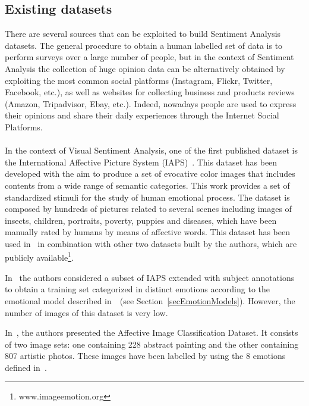 \subsection{Existing datasets}
There are several sources that can be exploited to build Sentiment Analysis datasets. The general procedure to obtain a human labelled set of data is to perform surveys over a large number of people, but in the context of Sentiment Analysis the collection of huge opinion data can be alternatively obtained by exploiting the most common social platforms (Instagram, Flickr, Twitter, Facebook, etc.), as well as websites for collecting business and products reviews (Amazon, Tripadvisor, Ebay, etc.). Indeed, nowadays people are used to express their opinions and share their daily experiences through the Internet Social Platforms.
\\
\\
In the context of Visual Sentiment Analysis, one of the first published dataset is the International Affective Picture System (IAPS)~\cite{lang1999international}. This dataset has been developed with the aim to produce a set of evocative color images that includes contents from a wide range of semantic categories. This work provides a set of standardized stimuli for the study of human emotional process. %
The dataset is composed by hundreds of pictures related to several scenes including images of insects, children, portraits, poverty, puppies and diseases, which have been manually rated by humans by means of affective words.
This dataset has been used in~\cite{machajdik2010affective} in combination with other two datasets built by the authors, which are publicly available\footnote{www.imageemotion.org}.

In~\cite{yanulevskaya2008emotional} the authors considered a subset of IAPS extended with subject annotations to obtain a training set categorized in distinct emotions according to the emotional model described in~\cite{mikels2005emotional}~(see Section~\ref{secEmotionModels}). %
However, the number of images of this dataset is very low.

In~\cite{machajdik2010affective}, the authors presented the Affective Image Classification Dataset. It consists of two image sets: one containing 228 abstract painting and the other containing 807 artistic photos. These images have been labelled by using the 8 emotions defined in~\cite{mikels2005emotional}.

